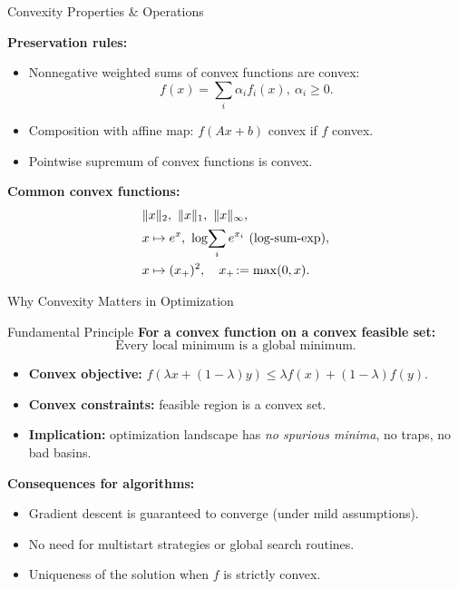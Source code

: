 \documentclass[aspectratio=169]{beamer}
\begin{document}
\begin{frame}{Convexity Properties \& Operations}

\textbf{Preservation rules:}
\begin{itemize}
  \item Nonnegative weighted sums of convex functions are convex:
  \[
  f(x)=\sum_i \alpha_i f_i(x),\ \alpha_i\ge0.
  \]
  \item Composition with affine map: \(f(Ax+b)\) convex if \(f\) convex.
  \item Pointwise supremum of convex functions is convex.
\end{itemize}
\pause
\textbf{Common convex functions:}
\[
\begin{aligned}
&\|x\|_2,\ \|x\|_1,\ \|x\|_\infty,\\
&x\mapsto e^x,\ \log\!\sum_i e^{x_i}\ (\text{log-sum-exp}),\\
\vspace{-3mm}
&x\mapsto (x_+)^2,\quad x_+\!:=\max(0,x).
\end{aligned}
\]
\pause
\end{frame}

\begin{frame}{Why Convexity Matters in Optimization}

\begin{block}{Fundamental Principle}
\textbf{For a convex function on a convex feasible set:}  
\[
\text{Every local minimum is a global minimum.}
\]
\end{block}

\begin{itemize}
  \item \textbf{Convex objective:} \(f(\lambda x + (1-\lambda)y) \le \lambda f(x) + (1-\lambda)f(y)\).
  \item \textbf{Convex constraints:} feasible region is a convex set.
  \item \textbf{Implication:} optimization landscape has \emph{no spurious minima}, no traps, no bad basins.
\end{itemize}

\vspace{0.5em}

\textcolor{BootcampBlueDark}{\textbf{Consequences for algorithms:}}
\begin{itemize}
  \item Gradient descent is guaranteed to converge (under mild assumptions).
  \item No need for multistart strategies or global search routines.
  \item Uniqueness of the solution when \(f\) is strictly convex.
\end{itemize}


\end{frame}
\end{document}
